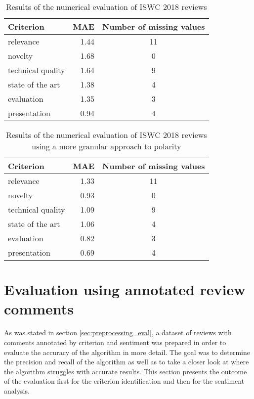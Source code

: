 \begin{table}[!htb]
\caption{Results of the numerical evaluation of ISWC 2018 reviews}
\label{tab:eval_numerical}
\centering
\begin{tabular}{l|D{.}{.}{2}|c}
\textbf{Criterion} & \textbf{MAE} & \textbf{Number of missing values} \\ \hline
relevance          & 1.44         & 11                                \\
novelty            & 1.68          & 0                                \\
technical quality  & 1.64         & 9                                \\
state of the art   & 1.38          & 4                                 \\
evaluation         & 1.35          & 3                                 \\
presentation       & 0.94          & 4 
\end{tabular}
\end{table}

\begin{table}[!htb]
\caption{Results of the numerical evaluation of ISWC 2018 reviews using a more granular approach to polarity}
\label{tab:eval_numerical_granular}
\centering
\begin{tabular}{l|D{.}{.}{2}|c}
\textbf{Criterion} & \textbf{MAE} & \textbf{Number of missing values} \\ \hline
relevance          & 1.33        & 11                                \\
novelty            & 0.93          & 0
\\
technical quality  & 1.09         & 9                                \\
state of the art   & 1.06         & 4                                 \\
evaluation         & 0.82          & 3                                 \\
presentation       & 0.69          & 4                                
\end{tabular}
\end{table}

\section{Evaluation using annotated review comments}
As was stated in section \ref{sec:preprocessing_eval}, a dataset of reviews with comments annotated by criterion and sentiment was prepared in order to evaluate the accuracy of the algorithm in more detail. The goal was to determine the precision and recall of the algorithm as well as to take a closer look at where the algorithm struggles with accurate results. This section presents the outcome of the evaluation first for the criterion identification and then for the sentiment analysis.

